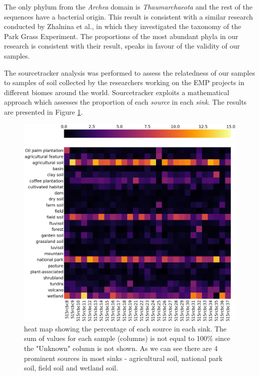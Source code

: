 \documentclass[12pt,twocolumn]{article} %
\begin{document}
\par
The only phylum from the \textit{Archea} domain is \textit{Thaumarchaeota} and the rest of the  sequences have a bacterial origin. This result is consistent with a similar research conducted by Zhalnina et al.\cite{Zhalnina2014}, in which they investigated the taxonomy of the Park Grass Experiment. The proportions of the most abundant phyla in our research is consistent with their result, speaks in favour of the validity of our samples.
\par
The sourcetracker analysis was performed to assess the relatedness of our samples to samples of soil collected by the researchers working on the EMP projects in different biomes around the world. Sourcetracker exploits a mathematical approach which assesses the proportion of each \textit{source} in each \textit{sink}. The results are presented in Figure \ref{fig:sourcetracker_heatmap}. 
\begin{figure}[ht!] %
	\includegraphics[width=\linewidth]{heatmap_perc.png}
	\caption{heat map showing the percentage of each source in each sink. The sum of values for each sample (columns) is not equal to 100\% since the "Unknown" column is not shown. As we can see there are 4 prominent sources in most sinks - agricultural soil, national park soil, field soil and wetland soil.}
	\label{fig:sourcetracker_heatmap}
\end{figure}
\par
\end{document}
